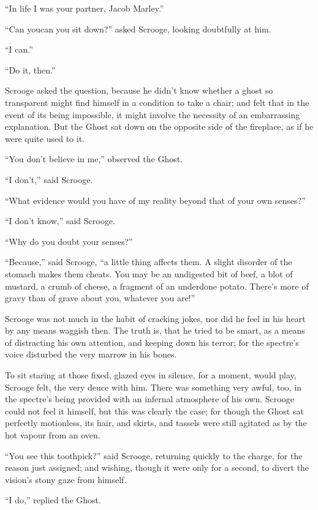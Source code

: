 \documentclass[paper=5.5in:8.5in,BCOR=7mm,twoside,DIV=calc,12pt,usegeometry]{scrbook} %
\begin{document}
\enquote{In life I was your partner, Jacob Marley.}

\enquote{Can you\textemdash can you sit down?} asked Scrooge, looking doubtfully at him.

\enquote{I can.}

\enquote{Do it, then.}

Scrooge asked the question, because he didn't know whether a ghost so transparent might find himself in a condition to take a chair; and felt that in the event of its being impossible, it might involve the necessity of an embarrassing explanation. But the Ghost sat down on the opposite side of the fireplace, as if he were quite used to it.

\enquote{You don't believe in me,} observed the Ghost.

\enquote{I don't,} said Scrooge.

\enquote{What evidence would you have of my reality beyond that of your own senses?}

\enquote{I don't know,} said Scrooge.

\enquote{Why do you doubt your senses?}

\enquote{Because,} said Scrooge, \enquote{a little thing affects them. A slight disorder of the stomach makes them cheats. You may be an undigested bit of beef, a blot of mustard, a crumb of cheese, a fragment of an underdone potato. There's more of gravy than of grave about you, whatever you are!}

Scrooge was not much in the habit of cracking jokes, nor did he feel in his heart by any means waggish then. The truth is, that he tried to be smart, as a means of distracting his own attention, and keeping down his terror; for the spectre's voice disturbed the very marrow in his bones.

To sit staring at those fixed, glazed eyes in silence, for a moment, would play, Scrooge felt, the very deuce with him. There was something very awful, too, in the spectre's being provided with an infernal atmosphere of his own. Scrooge could not feel it himself, but this was clearly the case; for though the Ghost sat perfectly motionless, its hair, and skirts, and tassels were still agitated as by the hot vapour from an oven.

\enquote{You see this toothpick?} said Scrooge, returning quickly to the charge, for the reason just assigned; and wishing, though it were only for a second, to divert the vision's stony gaze from himself.

\enquote{I do,} replied the Ghost.
\end{document}
